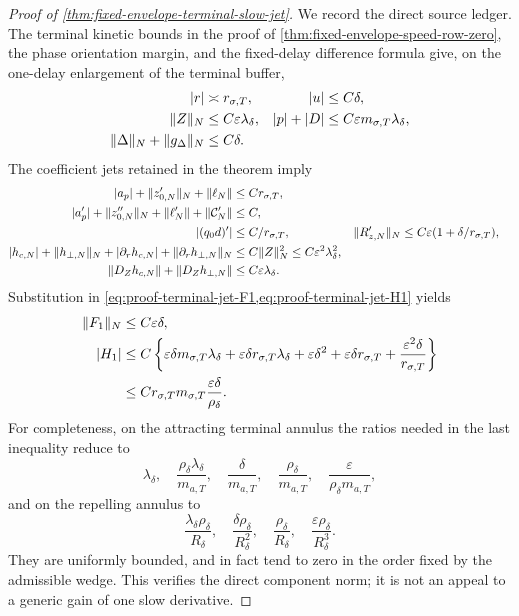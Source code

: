 \begin{proof}[Proof of
\cref{thm:fixed-envelope-terminal-slow-jet}]
We record the direct source ledger.  The terminal kinetic bounds in the
proof of \cref{thm:fixed-envelope-speed-row-zero}, the phase orientation
margin, and the fixed-delay difference formula give, on the one-delay
enlargement of the terminal buffer,
\begin{align}
 |r|&\asymp r_{\sigma,T},& |u|&\le C\delta,\notag\\
 \|Z\|_N&\le C\varepsilon\lambda_\delta,&
 |p|+|D|&\le C\varepsilon m_{\sigma,T}\lambda_\delta,\notag\\
 \|\Delta\|_N+\|g_\Delta\|_N&\le C\delta.       \label{eq:proof-terminal-jet-base-ledger}
\end{align}
The coefficient jets retained in the theorem imply
\begin{align}
 |a_p|+\|z_{0,N}'\|_N+\|\ell_N\|
 &\le Cr_{\sigma,T},\notag\\
 |a_p'|+\|z_{0,N}''\|_N+\|\ell_N'\|
       +\|\mathcal C_N'\|&\le C,\notag\\
 |(q_0d)'|&\le C/r_{\sigma,T},&
 \|R_{z,N}'\|_N&\le C\varepsilon
       (1+\delta/r_{\sigma,T}),\notag\\
 |h_{c,N}|+\|h_{\perp,N}\|_N
       +|\partial_rh_{c,N}|+\|\partial_rh_{\perp,N}\|_N
 &\le C\|Z\|_N^2
       \le C\varepsilon^2\lambda_\delta^2,\notag\\
 \|D_Zh_{c,N}\|+\|D_Zh_{\perp,N}\|
 &\le C\varepsilon\lambda_\delta.              \label{eq:proof-terminal-jet-coefficient-ledger}
\end{align}
Substitution in
\cref{eq:proof-terminal-jet-F1,eq:proof-terminal-jet-H1} yields
\begin{align}
 \|F_1\|_N&\le C\varepsilon\delta,\notag\\
 |H_1|&\le C\left\{
  \varepsilon\delta m_{\sigma,T}\lambda_\delta
 +\varepsilon\delta r_{\sigma,T}\lambda_\delta
 +\varepsilon\delta^2+\varepsilon\delta r_{\sigma,T}
 +\frac{\varepsilon^2\delta}{r_{\sigma,T}}\right\}\notag\\
 &\le Cr_{\sigma,T}m_{\sigma,T}
             \frac{\varepsilon\delta}{\rho_\delta}.     \label{eq:proof-terminal-jet-source-ledger}
\end{align}
For completeness, on the attracting terminal annulus the ratios needed in
the last inequality reduce to
\[
 \lambda_\delta,\quad
 \frac{\rho_\delta\lambda_\delta}{m_{a,T}},\quad
 \frac\delta{m_{a,T}},\quad
 \frac{\rho_\delta}{m_{a,T}},\quad
 \frac\varepsilon{\rho_\delta m_{a,T}},
\]
and on the repelling annulus to
\[
 \frac{\lambda_\delta\rho_\delta}{R_\delta},\quad
 \frac{\delta\rho_\delta}{R_\delta^2},\quad
 \frac{\rho_\delta}{R_\delta},\quad
 \frac{\varepsilon\rho_\delta}{R_\delta^3}.
\]
They are uniformly bounded, and in fact tend to zero in the order fixed by
the admissible wedge.  This verifies the direct component norm; it is not
an appeal to a generic gain of one slow derivative.


\end{proof}
